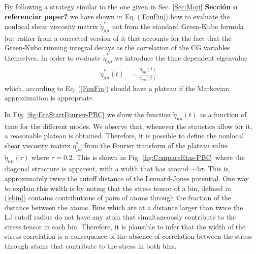 \documentclass[b5paper,openright,11pt]{book}
\newcommand{\Note}[1]{{\bf \color{red}#1}}    %
\begin{document}
By following a  strategy similar to the one given  in Sec. \ref{Sec:Mori} \Note{Sección o referenciar paper?} we
have shown in  Eq. (\ref{FouFin}) how to evaluate  the nonlocal shear
viscosity  matrix  $\tilde{\eta}^*_{\mu\mu}$  not  from  the  standard
Green-Kubo  formula but  rather from  a corrected  version of  it that
accounts for the  fact that the Green-Kubo running  integral decays as
the correlation of  the CG variables themselves. In  order to evaluate
$\tilde{\eta}^*_{\mu\mu}$ we introduce the time dependent eigenvalue
\begin{align}
\tilde{\eta}_{\mu\mu}^*(t)&=\frac{\tilde{\eta}_{\mu\mu}(t) }{\tilde{c}_{\mu\mu}(t)}
\label{FouFint}
\end{align}
which, according  to Eq. (\ref{FouFin})  should have a plateau  if the
Markovian approximation is appropriate.

In    Fig.      \ref{fig:EtaStartFourier-PBC}    we    show     the    function
$\tilde{\eta}_{\mu\mu}(t)$  as a  function of  time for  the different
modes.   We observe  that, whenever  the  statistics allow  for it,  a
reasonable plateau  is obtained. Therefore,  it is possible  to define
the  nonlocal  shear  viscosity  matrix  $\eta^*_{\mu\nu}$  from  the
Fourier transform  of the plateau  value $\tilde{\eta}_{\mu\mu}(\tau)$
where $\tau=0.2$.  This  is shown in Fig.  \ref{fig:CompareEtas-PBC} where the
diagonal structure  is apparent,  with a width  that has  around $\sim
5\sigma$.  This  is, approximately  twice the  cutoff distance  of the
Lennard-Jones potential.  One way to  explain this width is  by noting
that  the stress  tensor of  a bin,  defined in  (\ref{sbin}) contains
contributions of pairs  of atoms through the fraction  of the distance
between the atoms. Bins which are  at a distance larger than twice the
LJ cutoff radius  do not have any atom  that simultaneously contribute
to the stress tensor in each  bin. Therefore, it is plausible to infer
that the width of the stress correlation is a consequence of the absence
of correlation between the stress through atoms that contribute to the stress
in both bins.
\end{document}
